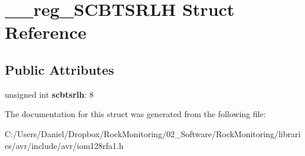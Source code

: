 \hypertarget{struct____reg___s_c_b_t_s_r_l_h}{}\section{\+\_\+\+\_\+reg\+\_\+\+S\+C\+B\+T\+S\+R\+LH Struct Reference}
\label{struct____reg___s_c_b_t_s_r_l_h}
\subsection*{Public Attributes}
\begin{DoxyCompactItemize}
\item 
unsigned int {\bfseries scbtsrlh}\+: 8\hypertarget{struct____reg___s_c_b_t_s_r_l_h_a5dbbc0755992aef9f8f071ca0fc49b84}{}\label{struct____reg___s_c_b_t_s_r_l_h_a5dbbc0755992aef9f8f071ca0fc49b84}

\end{DoxyCompactItemize}


The documentation for this struct was generated from the following file\+:\begin{DoxyCompactItemize}
\item 
C\+:/\+Users/\+Daniel/\+Dropbox/\+Rock\+Monitoring/02\+\_\+\+Software/\+Rock\+Monitoring/libraries/avr/include/avr/iom128rfa1.\+h\end{DoxyCompactItemize}
